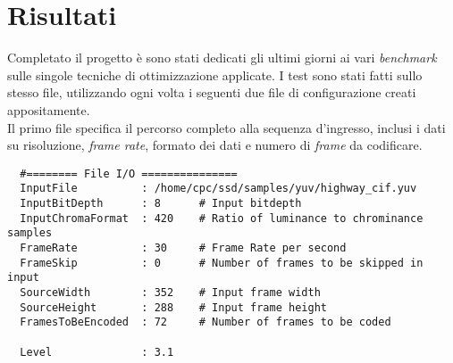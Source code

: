 
\chapter{Risultati} %

\label{Chapter7} %


Completato il progetto è sono stati dedicati gli ultimi giorni ai vari 
\emph{benchmark} sulle singole tecniche di ottimizzazione applicate. 
I test sono stati fatti sullo stesso file, utilizzando ogni volta i seguenti 
due file di configurazione creati appositamente.\\

Il primo file specifica il percorso completo alla sequenza d'ingresso, inclusi 
i dati su risoluzione, \emph{frame rate}, formato dei dati e numero di 
\emph{frame} da codificare.

\begin{lstlisting}
  #======== File I/O ===============
  InputFile          : /home/cpc/ssd/samples/yuv/highway_cif.yuv
  InputBitDepth      : 8      # Input bitdepth
  InputChromaFormat  : 420    # Ratio of luminance to chrominance samples
  FrameRate          : 30     # Frame Rate per second
  FrameSkip          : 0      # Number of frames to be skipped in input
  SourceWidth        : 352    # Input frame width
  SourceHeight       : 288    # Input frame height
  FramesToBeEncoded  : 72     # Number of frames to be coded
  
  Level              : 3.1
\end{lstlisting}


